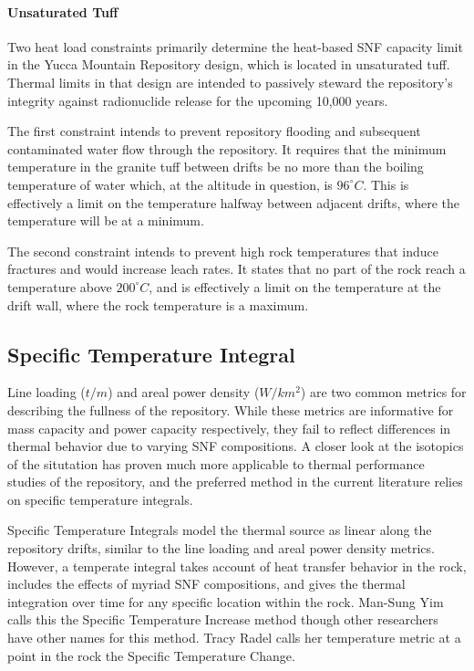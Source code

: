 \paragraph{Unsaturated Tuff}

Two heat load constraints primarily determine the heat-based SNF 
capacity limit in the Yucca Mountain Repository design, which is 
located in unsaturated tuff. Thermal limits in that design are 
intended to passively steward the repository's integrity against 
radionuclide release for the upcoming 10,000 years.

The first constraint intends to prevent repository flooding and 
subsequent contaminated water flow through the repository. It requires 
that the minimum temperature in the granite tuff between drifts be no 
more than the boiling temperature of water which, at the altitude in 
question, is $96^{\circ}C$. This is effectively a limit on the 
temperature halfway between adjacent drifts, where the temperature 
will be at a minimum.

The second constraint intends to prevent high rock temperatures that 
induce fractures and would increase leach rates. It states that no 
part of the rock reach a temperature above $200^{\circ}C$, and is 
effectively a limit on the temperature at the drift wall, where the 
rock temperature is a maximum.  

\subsection{Specific Temperature Integral}

Line loading ($t/m$) and areal power density ($W/km^2$) are two common 
metrics for describing the fullness of the repository. While these 
metrics are informative for mass capacity and power capacity 
respectively, they fail to reflect differences in thermal behavior due 
to varying SNF compositions.  A closer look at the isotopics of the 
situtation has proven much more applicable to thermal performance 
studies of the repository, and the preferred method in the current 
literature relies on specific temperature integrals.


Specific Temperature Integrals model the thermal source as linear 
along the repository drifts, similar to the line loading and areal 
power density metrics. However, a temperate integral takes account of 
heat transfer behavior in the rock, includes the effects of myriad SNF 
compositions, and gives the thermal integration over time for any 
specific location within the rock.  Man-Sung Yim calls this the 
Specific Temperature Increase method\cite{YimSTI} though other 
researchers have other names for this method. Tracy Radel calls her 
temperature metric at a point in the rock the Specific Temperature 
Change.\cite{radel_repository_2007}

